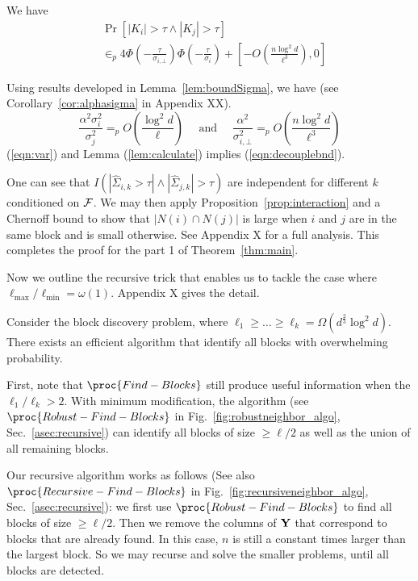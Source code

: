 We have
\begin{equation}\label{eqn:decouplebnd}
\begin{split}
    &\Pr[|K_i| > \tau \wedge |K_j| > \tau]\\
    &\in_p 4\Phi\left(-\frac{\tau}{\sigma_{i,\bot}} \right)\Phi\left(-\frac{\tau}{\sigma_{i}} \right) + \left[-O\left(\frac{n \log^2d}{ \ell^{3}}\right), 0 \right]
\end{split}
\end{equation}

Using results developed in Lemma~\ref{lem:boundSigma}, we have (see {\color{red} Corollary~\ref{cor:alphasigma} in Appendix XX}). 
\begin{equation}\label{eqn:var}
   \frac{\alpha^2 \sigma^2_i}{\sigma^2_j} =_p O\left(\frac{\log^2 d}{\ell} \right)
\quad \mbox{ and } \quad 
    \frac{\alpha^2}{\sigma^2_{i,\bot}} =_p O\left(\frac{n \log^2 d}{\ell^{3}}\right)
\end{equation} 
(\ref{eqn:var}) and Lemma (\ref{lem:calculate}) implies (\ref{eqn:decouplebnd}). 


 One can see that $I(|\hat \Sigma_{i,k} > \tau| \wedge |\hat \Sigma_{j,k}| > \tau)$ are independent for different $k$ conditioned on $\mathcal{F}$. 
We may then apply Proposition~\ref{prop:interaction} and a Chernoff bound to show that $|N(i) \cap N(j)|$ is large when $i$ and $j$ are in the same block and is small otherwise. See {\color{red} Appendix X} for a full analysis. This completes the proof for the part 1 of Theorem~\ref{thm:main}. 

Now we outline the recursive trick that enables us to tackle the case where $\ell_{\max} / \ell_{\min} = \omega(1)$. {\color{red} Appendix X gives the detail.}

\begin{corollary}\label{cor:recursive} Consider the block discovery problem, where $\ell_1 \geq \dots \geq \ell_k = \Omega(d^{\frac 2 3}\log^2d)$. There exists an efficient algorithm that identify all blocks with overwhelming probability. 
\end{corollary}

First, note that $\proc{Find-Blocks}$ still produce useful information when the $\ell_1 / \ell_k > 2$. With minimum modification, the algorithm (see $\proc{Robust-Find-Blocks}$ in Fig.~\ref{fig:robustneighbor_algo}, Sec.~\ref{asec:recursive}) can identify all blocks of size $\geq \ell/2$ as well as the union of all remaining blocks. 

Our recursive algorithm works as follows (See also $\proc{Recursive-Find-Blocks}$ in Fig.~\ref{fig:recursiveneighbor_algo}, Sec.~\ref{asec:recursive}): we first use $\proc{Robust-Find-Blocks}$ to find all blocks of size $\geq \ell/2$. Then we remove the columns of $\mathbf{Y}$ that correspond to blocks that are already found. In this case, $n$ is still a constant times larger than the largest block. So we may recurse and solve the smaller problems, until all blocks are detected. 
 